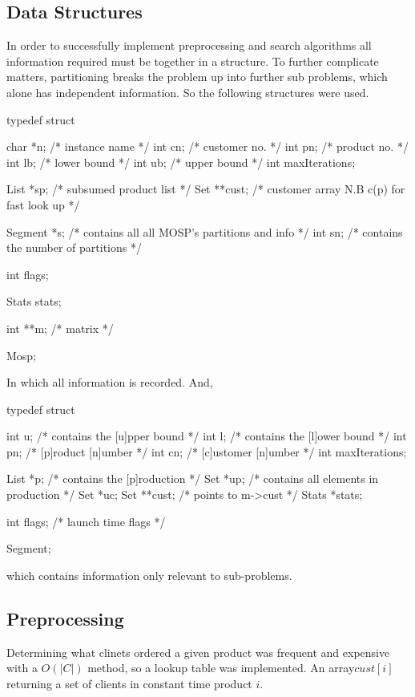 \subsection{Data Structures}
In order to successfully implement preprocessing and search
algorithms all information required must be together in a structure. To further
complicate matters, partitioning breaks the problem up into further sub
problems, which alone has independent information. So the following structures
were used.
\begin{listing}
typedef struct {
  char *n;        /* instance name */
  int cn;         /* customer no. */
  int pn;         /* product no. */
  int lb;         /* lower bound */
  int ub;         /* upper bound */
  int maxIterations;

  List *sp;       /* subsumed product list */
  Set **cust;     /* customer array N.B c(p) for fast look up */

  Segment *s;     /* contains all all MOSP's partitions and info */
  int sn;         /* contains the number of partitions */

  int flags;

  Stats stats;

  int **m;        /* matrix */
} Mosp;
\end{listing}

In which all information is recorded.  And,
\begin{listing}
typedef struct {
  int u;          /* contains the [u]pper bound */
  int l;          /* contains the [l]ower bound */
  int pn;         /* [p]roduct [n]umber */
  int cn;         /* [c]ustomer [n]umber */
  int maxIterations;

  List *p;        /* contains the [p]roduction */
  Set *up;        /* contains all elements in production */
  Set *uc;
  Set **cust;     /* points to m->cust */
  Stats *stats;

  int flags;      /* launch time flags */
} Segment;
\end{listing}
which contains information only relevant to sub-problems.

\subsection{Preprocessing}
Determining what clinets ordered a given product was frequent and expensive
with a $O(|C|)$ method, so a lookup table was implemented. An array$ cust[i]$
returning a set of clients in constant time product $i$.

